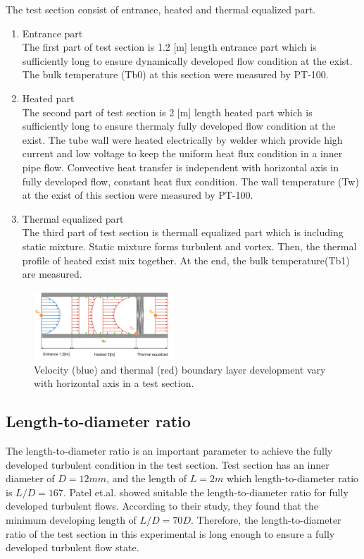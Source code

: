 \documentclass[conference]{IEEEtran}
\begin{document}
The test section consist of entrance, heated and thermal equalized part.
\begin{enumerate}
  \item Entrance part\\
  The first part of test section is 1.2 [m] length entrance part which is sufficiently long to ensure dynamically developed flow condition at the exist.
  The bulk temperature (Tb0) at this section were measured by PT-100.
  \item Heated part\\
  The second part of test section is 2 [m] length heated part which is sufficiently long to ensure thermaly fully developed flow condition at the exist.
  The tube wall were heated electrically by welder which provide high current and low voltage to keep the uniform heat flux condition in a inner pipe flow.
  Convective heat transfer is independent with horizontal axis in fully developed flow, constant heat flux condition.
  The wall temperature (Tw) at the exist of this section were measured by PT-100.
  \item Thermal equalized part\\
  The third part of test section is thermall equalized part which is including static mixture. Static mixture forms turbulent and vortex. Then, the thermal profile of heated exist mix together. At the end, the bulk temperature(Tb1) are measured.
\end{enumerate}
\begin{figure}[htbp]
  \centering
\includegraphics[width=0.47\textwidth,natwidth=850,natheight=450]{fig/thermal_boundary_layer_development.png}
  \caption{Velocity (blue) and thermal (red) boundary layer development vary with horizontal axis in a test section.}
  \label{thermal_boundary_layer_development}
\end{figure}

\newpage

\subsection{Length-to-diameter ratio}
The length-to-diameter ratio is an important parameter to achieve the fully developed turbulent condition in the test section.
Test section has an inner diameter of $D=12mm$, and the length of $L=2m$ which length-to-diameter ratio is $L/D=167$.
Patel et.al.\cite{Patel1969} showed suitable the length-to-diameter ratio for fully developed turbulent flows.
According to their study, they found that the minimum developing length of $L/D=70D$.
Therefore, the length-to-diameter ratio of the test section in this experimental is long enough to ensure a fully developed turbulent flow state.
\end{document}
